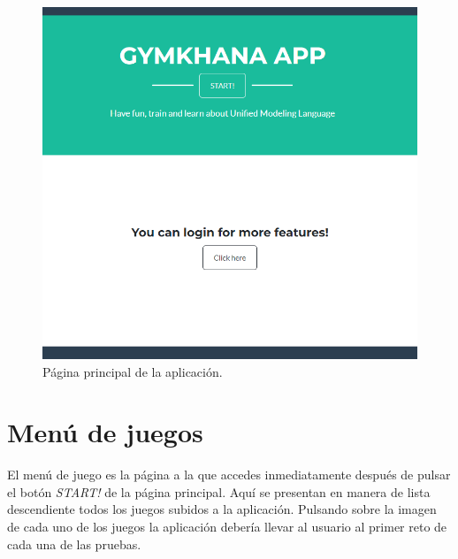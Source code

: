 \documentclass[a4paper, 12pt]{book}
\begin{document}
\begin{figure}
	\centering
	\includegraphics[width=16cm, keepaspectratio]{img/home_html.png}
	\caption{Página principal de la aplicación.}\label{fig:home}
\end{figure}

\section{Menú de juegos}
El menú de juego es la página a la que accedes inmediatamente después de pulsar el botón \emph{START!} de la página principal. Aquí se presentan en manera de lista descendiente todos los juegos subidos a la aplicación. Pulsando sobre la imagen de cada uno de los juegos la aplicación debería llevar al usuario al primer reto de cada una de las pruebas. 
\end{document}
